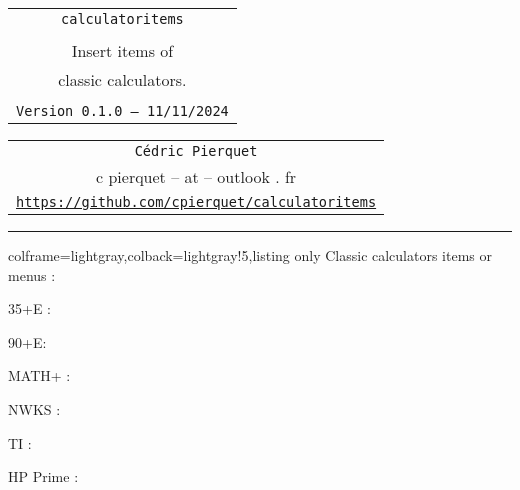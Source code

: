 \documentclass[11pt,a4paper]{ltxdoc}
\def\TPversion{0.1.0}
\def\TPdate{11/11/2024}
\begin{document}
\thispagestyle{empty}

\begin{center}
	\begin{minipage}{0.88\linewidth}
		\begin{tcolorbox}[colframe=yellow,colback=yellow!15]
			\begin{center}
				\renewcommand{\arraystretch}{1.25}%
				\begin{tabular}{c}
					{\Huge \texttt{calculatoritems}}\\
					\\
					{\LARGE Insert items of} \\
					{\LARGE classic calculators.} \\
					\\
					{\small \texttt{Version \TPversion{} -- \TPdate}}
				\end{tabular}
			\end{center}
		\end{tcolorbox}
	\end{minipage}
\end{center}

\begin{center}
	\begin{tabular}{c}
		\texttt{Cédric Pierquet}\\
		{\ttfamily c pierquet -- at -- outlook . fr}\\
		\texttt{\url{https://github.com/cpierquet/calculatoritems}} \\
	\end{tabular}
\end{center}

\hrule

\vfill

\begin{tcblisting}{colframe=lightgray,colback=lightgray!5,listing only}
Classic calculators items or menus :

35+E :

90+E:

MATH+ :

NWKS :

TI :

HP Prime :
\end{tcblisting}
\end{document}
